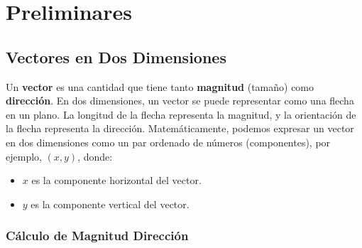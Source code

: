 \documentclass[11pt,a4paper]{article}
\begin{document}
\section{Preliminares}

\subsection{Vectores en Dos Dimensiones}

Un \textbf{vector} es una cantidad que tiene tanto \textbf{magnitud} (tamaño) como \textbf{dirección}. En dos dimensiones, un vector se puede representar como una flecha en un plano.  La longitud de la flecha representa la magnitud, y la orientación de la flecha representa la dirección.  Matemáticamente, podemos expresar un vector en dos dimensiones como un par ordenado de números (componentes), por ejemplo, $(x, y)$, donde:
\begin{itemize}
    \item $x$ es la componente horizontal del vector.
    \item $y$ es la componente vertical del vector.
\end{itemize}

\subsubsection{Cálculo de Magnitud Dirección}

\end{document}
